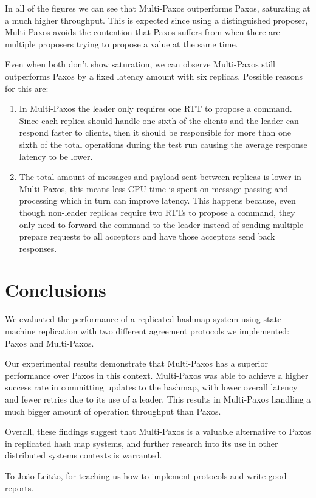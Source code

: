 \documentclass[sigconf]{acmart}
\begin{document}
In all of the figures we can see that Multi-Paxos outperforms Paxos, saturating at a much higher throughput. This is expected since using a distinguished proposer, Multi-Paxos avoids the contention that Paxos suffers from when there are multiple proposers trying to propose a value at the same time.

Even when both don't show saturation, we can observe Multi-Paxos still outperforms Paxos by a fixed latency amount with six replicas. Possible reasons for this are:
\begin{enumerate}
    \item In Multi-Paxos the leader only requires one RTT to propose a command. Since each replica should handle one sixth of the clients and the leader can respond faster to clients, then it should be responsible for more than one sixth of the total operations during the test run causing the average response latency to be lower.
    \item The total amount of messages and payload sent between replicas is lower in Multi-Paxos, this means less CPU time is spent on message passing and processing which in turn can improve latency. This happens because, even though non-leader replicas require two RTTs to propose a command, they only need to forward the command to the leader instead of sending multiple prepare requests to all acceptors and have those acceptors send back responses.
\end{enumerate}

\section{Conclusions}

We evaluated the performance of a replicated hashmap system using state-machine replication with two different agreement protocols we implemented: Paxos and Multi-Paxos.

Our experimental results demonstrate that Multi-Paxos has a superior performance over Paxos in this context. Multi-Paxos was able to achieve a higher success rate in committing updates to the hashmap, with lower overall latency and fewer retries due to its use of a leader. This results in Multi-Paxos handling a much bigger amount of operation throughput than Paxos.

Overall, these findings suggest that Multi-Paxos is a valuable alternative to Paxos in replicated hash map systems, and further research into its use in other distributed systems contexts is warranted.

\begin{acks}
    To João Leitão, for teaching us how to implement protocols and write good reports.
\end{acks}



\end{document}
